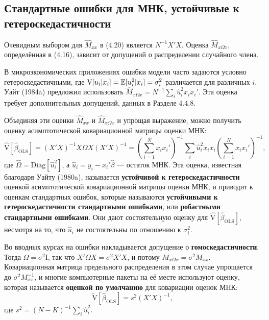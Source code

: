 \subsection{Стандартные ошибки для МНК, устойчивые к гетероскедастичности}

Очевидным выбором для $\hat{M}_{xx}$ в (4.20) является $N^{-1}X'X$. Оценка $ \hat{M}_{x \Omega x}$, определённая в (4.16), зависит от допущений о распределении случайного члена. 

В микроэкономических приложениях ошибки модели часто задаются условно гетероскедастичными, где $\mathrm{V}[u_i|x_i] = \mathbb{E}[u_i^2|x_i]= \sigma_i^2$ различается для различных $i$. Уайт (1984a) предложил использовать  $ \hat{M}_{x \Omega x} = N^{-1}\sum_i \hat{u}_i^2 x_i x_i'$. Эта оценка требует дополнительных допущений, данных в Разделе 4.4.8.

Объединяя эти оценки $\hat{M}_{xx}$ и $\hat{M}_{x \Omega x}$ и упрощая выражение, можно получить оценку асимптотической ковариационной матрицы оценки МНК:
\begin{equation}
\mathrm{\hat{V}}[\hat{\beta}_{\text{OLS}}] = (X'X)^{-1} X\Omega X (X'X)^{-1} = (\sum_{i=1}^N x_i x_i')^{-1} \sum_i \hat{u}_i^2 x_i x_i (\sum_{i=1}^N x_i x_i')^{-1},
\end{equation}
где $\hat{\Omega} = \mathrm{Diag}[\hat{u}_i^2]$, а $\hat{u}_i = y_i - x_i'\hat{\beta}$ --- остаток МНК. Эта оценка, известная благодаря Уайту (1980a), называется \textbf{устойчивой к гетероскедастичности} оценкой асимптотической ковариационной матрицы оценки МНК, и приводит к оценкам стандартных ошибок, которые называются \textbf{устойчивыми к гетероскедастичности стандартными ошибками}, или \textbf{робастными стандартными ошибками}. Они дают состоятельную оценку для $\mathrm{\hat{V}}[\hat{\beta}_{\text{OLS}}]$, несмотря на то, что $\hat{u}_i$ не состоятельны по отношению к $\sigma_i^2$.

Во вводных курсах на ошибки накладывается допущение о \textbf{гомоскедастичности}. Тогда $\Omega = \sigma^2 \mathrm{I}$, так что $X'\Omega X = \sigma^2 X'X$, и потому $M_{x \Omega x} = \sigma^2 M_{xx}$. Ковариационная матрица предельного распределения в этом случае упрощается до $\sigma^2 M_{xx}^{-1}$, и многие компьютерные пакеты на её месте используют оценку, которая называется \textbf{оценкой по умолчанию} для ковариации оценок МНК:
\begin{equation}
 \mathrm{\tilde{V}}[\hat{\beta}_{\text{OLS}}] = s^2 (X'X)^{-1},
 \end{equation} 
где $s^2 = (N-K)^{-1} \sum_i \hat{u}_i^2$.


